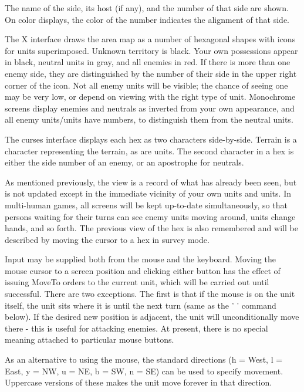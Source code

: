 The name of the side, its host (if any), and the number of that side are
shown.  On color displays, the color of the number indicates the alignment
of that side.
\par\noindent
The X interface
draws the area map as a number of hexagonal shapes with icons for
units superimposed.
Unknown territory is black.
Your own possessions appear in black,
neutral units in gray, and all enemies in red.  If there is more than
one enemy side, they are distinguished by the number of their side in
the upper right corner of the icon.  Not all enemy units
will be visible; the chance of seeing one may be very low, or depend
on viewing with the right type of unit.
Monochrome screens display enemies and
neutrals as inverted from your own appearance, and all enemy units/units
have numbers, to distinguish them from the neutral units.
\par\noindent
The curses interface displays each hex as two characters side-by-side.
Terrain is a character representing the terrain, as are units.  The second
character in a hex is either the side number of an enemy, or an apostrophe
for neutrals.
\par\noindent
As mentioned previously, the view is a record of what has already been
seen, but is not updated except in the immediate vicinity of your own
units and units.  In multi-human games, all screens will be kept
up-to-date simultaneously, so that persons waiting for their turns
can see enemy units moving around, units change hands, and so forth.
The previous view of the hex is also remembered and will be described
by moving the cursor to a hex in survey mode.
\par\noindent
Input may be supplied both from the mouse and the keyboard.
Moving the mouse cursor to a screen position and clicking either button
has the effect of issuing MoveTo orders to the current unit, which will
be carried out until successful.  There are two exceptions.  The first is
that if the mouse is on the unit itself, the unit sits where it is until
the next turn (same as the ' ' command below).  If the desired new
position is adjacent, the unit will unconditionally move there - this is
useful for attacking enemies.  At present, there is no special meaning
attached to particular mouse buttons.
\par\noindent
As an alternative to using the mouse,
the standard directions (h = West,
l = East, y = NW, u = NE, b = SW, n = SE) can be used to specify movement.
Uppercase versions of these makes the unit move forever in that direction.
